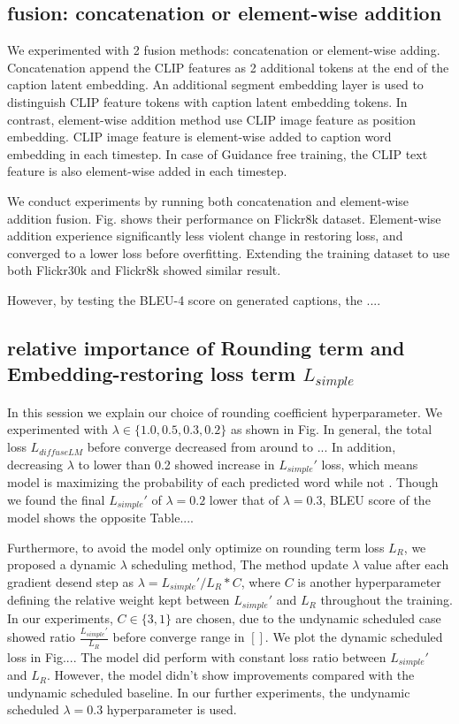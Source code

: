 \documentclass{article}
\begin{document}
\subsection{fusion: concatenation or element-wise addition}
We experimented with 2 fusion methods: concatenation or element-wise adding. Concatenation append the CLIP features as 2 additional tokens at the end of the caption latent embedding. An additional segment embedding layer is used to distinguish CLIP feature tokens with caption latent embedding tokens. In contrast, element-wise addition method use CLIP image feature as position embedding. CLIP image feature is element-wise added to caption word embedding in each timestep. In case of Guidance free training, the CLIP text feature is also element-wise added in each timestep.

We conduct experiments by running both concatenation and element-wise addition fusion. Fig. shows their performance on Flickr8k dataset. Element-wise addition experience significantly less violent change in restoring loss, and converged to a lower loss before overfitting. Extending the training dataset to use both Flickr30k and Flickr8k showed similar result. 

However, by testing the BLEU-4 score on generated captions, the ....



\subsection{relative importance of Rounding term and Embedding-restoring loss term $L_{simple}$}
In this session we explain our choice of rounding coefficient hyperparameter. We experimented with $\lambda \in \{1.0, 0.5, 0.3, 0.2\}$ as shown in Fig. In general, the total loss $L_{diffuseLM}$ before converge decreased from around to ... In addition, decreasing $\lambda$ to lower than 0.2 showed increase in $L_{simple}'$ loss, which means model is maximizing the probability of each predicted word while not . Though we found the final $L_{simple}'$ of $\lambda = 0.2$ lower that of $\lambda = 0.3$, BLEU score of the model shows the opposite Table....

Furthermore, to avoid the model only optimize on rounding term loss $L_R$, we proposed a dynamic $\lambda$ scheduling method, The method update $\lambda$ value after each gradient desend step as $\lambda = L_{simple}' / L_R * C$, where $C$ is another hyperparameter defining the relative weight kept between $L_{simple}'$ and $L_R$ throughout the training. In our experiments, $C \in \{3, 1\}$ are chosen, due to the undynamic scheduled case showed ratio $\frac{L_{simple}'}{L_R}$ before converge range in $[]$. We plot the dynamic scheduled loss in Fig.... The model did perform with constant loss ratio between $L_{simple}'$ and $L_R$. However, the model didn't show improvements compared with the undynamic scheduled baseline. In our further experiments, the undynamic scheduled $\lambda = 0.3$ hyperparameter is used. 
\end{document}

